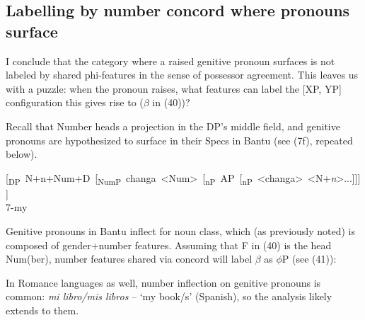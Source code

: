 \documentclass[output=paper
,modfonts
,nonflat]{langsci/langscibook}
\begin{document}
\subsection{Labelling by number concord where pronouns surface}
I conclude that the category where a raised genitive pronoun surfaces is not labeled by shared phi-features in the sense of possessor agreement. This leaves us with a puzzle: when the pronoun raises, what features can label the [XP, YP] configuration this gives rise to ($\beta$ in (40))? 

\begin{figure}[!h]
\begin{exe}
\end{exe}
\end{figure}
\noindent Recall that Number heads a projection in the DP’s middle field, and genitive pronouns are hypothesized to surface in their Specs in Bantu (see (7f), repeated below).

\begin{exe}
	\gll \mbox{[\textsubscript{DP} N+n+Num+D [\textsubscript{NumP} changa <Num> [\textsubscript{nP} AP [\textsubscript{nP}  <changa> <N+\textit{n}>...]]]]}\\
	\hspace{3.9cm}7-my \\
\end{exe}
Genitive pronouns in Bantu inflect for noun class, which (as previously noted) is composed of gender+number features. Assuming that F in (40) is the head Num(ber), number features shared via concord will label $\beta$ as $\phi$P (see (41)):

\begin{figure}[!h]
	\begin{exe}
	\end{exe}
\end{figure}
\newpage\noindent In Romance languages as well, number inflection on genitive pronouns is common: \textit{mi libro/mis libros} – ‘my book/s’ (Spanish), so the analysis likely extends to them.
\end{document}

